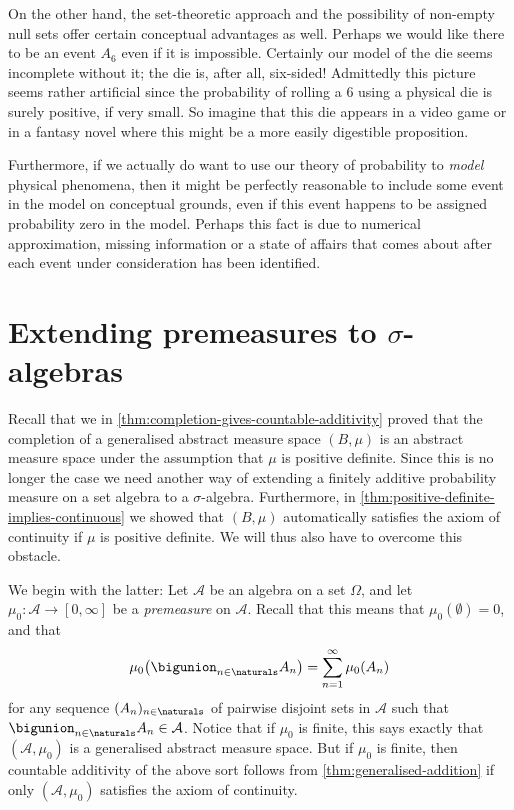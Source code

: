 \documentclass[article, a4paper, 11pt, oneside]{memoir}
\numberwithin{equation}{chapter}
\newcommand{\calA}{\mathcal{A}}
\begin{document}
On the other hand, the set-theoretic approach and the possibility of non-empty null sets offer certain conceptual advantages as well. Perhaps we would like there to be an event $A_6$ even if it is impossible. Certainly our model of the die seems incomplete without it; the die is, after all, six-sided! Admittedly this picture seems rather artificial since the probability of rolling a $6$ using a physical die is surely positive, if very small. So imagine that this die appears in a video game or in a fantasy novel where this might be a more easily digestible proposition.

Furthermore, if we actually do want to use our theory of probability to \emph{model} physical phenomena, then it might be perfectly reasonable to include some event in the model on conceptual grounds, even if this event happens to be assigned probability zero in the model. Perhaps this fact is due to numerical approximation, missing information or a state of affairs that comes about after each event under consideration has been identified.


\section[Extending premeasures to sigma-algebras][Extending premeasures to $\sigma$-algebras]{Extending premeasures to $\sigma$-algebras}

Recall that we in \cref{thm:completion-gives-countable-additivity} proved that the completion of a generalised abstract measure space $(B,\mu)$ is an abstract measure space under the assumption that $\mu$ is positive definite. Since this is no longer the case we need another way of extending a finitely additive probability measure on a set algebra to a $\sigma$-algebra. Furthermore, in \cref{thm:positive-definite-implies-continuous} we showed that $(B,\mu)$ automatically satisfies the axiom of continuity if $\mu$ is positive definite. We will thus also have to overcome this obstacle.


We begin with the latter: Let $\calA$ be an algebra on a set $\Omega$, and let $\mu_0 \colon \calA \to [0,\infty]$ be a \emph{premeasure} on $\calA$. Recall that this means that $\mu_0(\emptyset) = 0$, and that
%
\begin{equation*}
    \mu_0 \bigl( \bigunion_{n\in\naturals} A_n \bigr)
        = \sum_{n=1}^\infty \mu_0(A_n)
\end{equation*}
%
for any sequence $(A_n)_{n\in\naturals}$ of pairwise disjoint sets in $\calA$ such that $\bigunion_{n\in\naturals} A_n \in \calA$. Notice that if $\mu_0$ is finite, this says exactly that $(\calA,\mu_0)$ is a generalised abstract measure space. But if $\mu_0$ is finite, then countable additivity of the above sort follows from \cref{thm:generalised-addition} if only $(\calA,\mu_0)$ satisfies the axiom of continuity.
\end{document}
